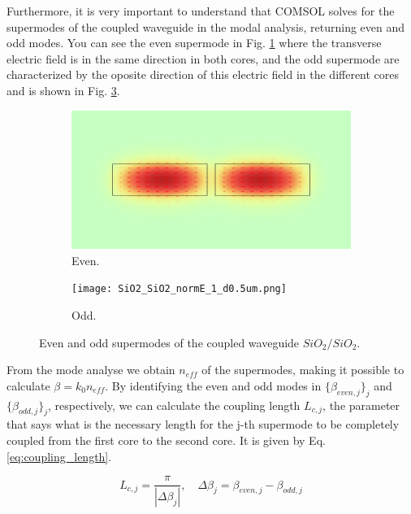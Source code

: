 \documentclass[a4paper,12pt]{article}
\begin{document}
Furthermore, it is very important to understand that COMSOL solves for the supermodes of the coupled waveguide in the modal analysis, returning even and odd modes. You can see the even supermode in Fig. \ref{fig:even_supermode} where the transverse electric field is in the same direction in both cores, and the odd supermode are characterized by the oposite direction of this electric field in the different cores and is shown in Fig. \ref{fig:odd_supermode}.

\begin{figure}[H]
    \centering
    \begin{subfigure}{0.45\textwidth}
        \centering
        \includegraphics[scale=0.32]{SiO2_SiO2_normE_0_d0.5um.png}
        \caption{Even.}
        \label{fig:even_supermode}
    \end{subfigure}
    \hfill
    \begin{subfigure}{0.45\textwidth}
        \centering
        \texttt{[image: SiO2\_SiO2\_normE\_1\_d0.5um.png]}
        \caption{Odd.}
        \label{fig:odd_supermode}
    \end{subfigure}
    \caption{Even and odd supermodes of the coupled waveguide $SiO_2/SiO_2$.}
\end{figure}

From the mode analyse we obtain $n_{eff}$ of the supermodes, making it possible to calculate $\beta = k_0 n_{eff}$. By identifying the even and odd modes in $\{\beta_{even,j}\}_j$ and $\{\beta_{odd,j}\}_j$, respectively, we can calculate the coupling length $L_{c,j}$, the parameter that says what is the necessary length for the j-th supermode to be completely coupled from the first core to the second core. It is given by Eq. \eqref{eq:coupling_length}.

\begin{equation}
    L_{c,j} = \frac{\pi}{|\Delta \beta_j|}, \quad \Delta \beta_j = \beta_{even, j} - \beta_{odd, j} 
    \label{eq:coupling_length}
\end{equation}
\end{document}
